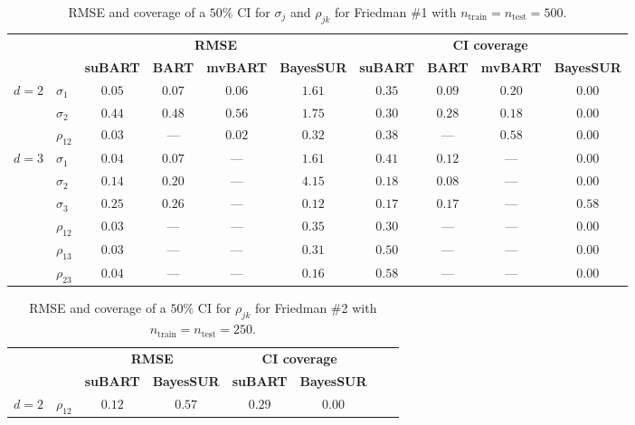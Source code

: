 \documentclass[aoas,preprint]{imsart}
\theoremstyle{plain}
\theoremstyle{definition}
\theoremstyle{remark}
\begin{document}
\begin{appendix}
\begin{table}[H]
\centering
\caption{RMSE and coverage of a $50\%$ CI for $\sigma_j$ and ${\rho}_{jk}$  for Friedman \#1 with $n_{\operatorname{train}} = n_{\operatorname{test}} =500$.}
\label{tab:sim_corr_fried_one_combined_500}
\begin{tabular}{llcccccccc}
\hline
\small
&& \multicolumn{4}{c}{\textbf{RMSE}} & \multicolumn{4}{c}{\textbf{CI coverage}} \\
& & \textbf{suBART} & \textbf{BART} & \textbf{mvBART} & \textbf{BayesSUR} & \textbf{suBART} & \textbf{BART} & \textbf{mvBART} & \textbf{BayesSUR} \\
\hline
\multirow{3}{*}{$d=2$}&{$\sigma_1$} & $0.05$ & $0.07$ & $0.06$ & $1.61$ & $0.35$ & $0.09$ & $0.20$ & $0.00$ \\
&{$\sigma_2$} & $0.44$ & $0.48$ & $0.56$ & $1.75$ & $0.30$ & $0.28$ & $0.18$ & $0.00$ \\
&{$\rho_{12}$} & $0.03$ & --- & $0.02$ & $0.32$ & $0.38$ & --- & $0.58$ & $0.00$ \\ 
\hline
\multirow{6}{*}{$d=3$}&{$\sigma_1$} & $0.04$ & $0.07$ & --- & $1.61$ & $0.41$ & $0.12$ & --- & $0.00$ \\
&{$\sigma_2$} & $0.14$ & $0.20$ & --- & $4.15$ & $0.18$ & $0.08$ & --- & $0.00$ \\
&{$\sigma_3$} & $0.25$ & $0.26$ & --- & $0.12$ & $0.17$ & $0.17$ & --- & $0.58$ \\
&{$\rho_{12}$} & $0.03$ & --- & --- & $0.35$ & $0.30$ & --- & --- & $0.00$ \\ 
&{$\rho_{13}$} & $0.03$ & --- & --- & $0.31$ & $0.50$ & --- & --- & $0.00$ \\
&{$\rho_{23}$} & $0.04$ & --- & --- & $0.16$ & $0.58$ & --- & --- & $0.00$ \\ 
\end{tabular}
\end{table}\vspace{-1em}%
\begin{table}[H]
\centering
\caption{RMSE and coverage of a $50\%$ CI for ${\rho}_{jk}$ for Friedman \#2 with $n_{\operatorname{train}} = n_{\operatorname{test}} = 250$.}
\label{tab:sim_corr_class_fried_one_combined_250}
\begin{tabular}{llcccccc}
\hline
\small
& & \multicolumn{2}{c}{\textbf{RMSE}} & \multicolumn{2}{c}{\textbf{CI coverage}} \\
& & \textbf{suBART} & \textbf{BayesSUR} & \textbf{suBART} & \textbf{BayesSUR} \\
\hline
$d=2$&{$\rho_{12}$} & $0.12$ & $0.57$ & $0.29$ & $0.00$ \\ 

\end{tabular}
\end{table}
\end{appendix}
\end{document}
